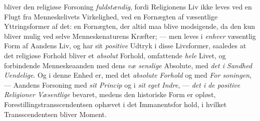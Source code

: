 \begin{enumerate}[label=\arabic*., leftmargin=*, labelsep=1em,
                  topsep=0.35\baselineskip, itemsep=0.35\baselineskip]
  bliver den religiøse Forsoning \emph{fuldstændig}, fordi Religionens Liv ikke
  leves ved en Flugt fra Menneskelivets Virkelighed, ved en Fornægten af
  væsentlige Yttringsformer af det: en Fornægten, der altid maa blive
  modsigende, da den kun bliver mulig ved selve Menneskenaturens Kræfter; --- men
  leves i \emph{enhver} væsentlig Form af Aandens Liv, og har sit
  \emph{positive} Udtryk i disse Livsformer, saaledes at det religiøse Forhold
  bliver et \emph{absolut} Forhold, omfattende \emph{hele} Livet, og forbindende
  Menneskeaanden med dens \emph{væ\-%
senslige} Absolute, med \emph{det i Sandhed Uendelige}. Og i denne Enhed er, med
  det \emph{absolute Forhold} og med \emph{For\-%
soningen}, --- Aandens Forsoning med \emph{sit Princip} og i \emph{sit eget
  Indre}, --- \emph{det i de positive Religioner Væsentlige} bevaret, medens den
  historiske Form er opløst, Forestillingstransscendentsen ophævet i det
  Immanentsfor\-%
hold, i hvilket Transscendentsen bliver Moment.


\end{enumerate}
